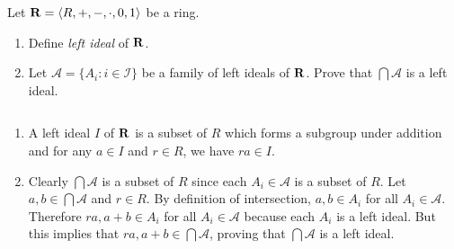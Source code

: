 \begin{problem}
Let $\mathbf{R} = \langle R, +, -, \cdot, 0, 1\rangle$ be a ring.  
\begin{enumerate}
\item Define \emph{left ideal} of $\mathbf{R}$.
\item Let $\mathscr{A} = \{A_i : i \in \mathscr{I}\}$ be a family of left ideals
of $\mathbf{R}$.  Prove that $\bigcap \mathscr{A}$ is a left ideal.
\end{enumerate}
\end{problem}
\smallskip
\begin{solution} 
$\left.\right.$\\
\begin{enumerate}
\item A left ideal $I$ of $\mathbf{R}$ is a subset of $R$ which forms a subgroup under addition and for any $a\in I$ and $r\in R$, we have $ra\in I$. 
\item Clearly $\bigcap \mathscr{A}$ is a subset of $R$ since each $A_i\in \mathscr{A}$ is a subset of $R$. Let $a,b\in \bigcap \mathscr{A}$ and $r\in R$. By definition of intersection, $a,b\in A_i$ for all $A_i \in \mathscr{A}$. Therefore $ra, a+b\in A_i$ for all $A_i \in \mathscr{A}$ because each $A_i$ is a left ideal. But this implies that $ra,a+b\in \bigcap \mathscr{A}$, proving that $\bigcap \mathscr{A}$ is a left ideal. 
\end{enumerate}
\end{solution}
\newpage 

